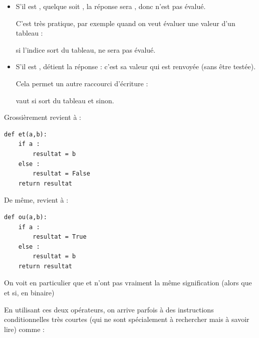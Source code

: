 \begin{itemize}
	\item S'il est , quelque soit , la réponse sera , donc  n'est pas évalué.
	
	C'est très pratique, par exemple quand on veut évaluer une valeur d'un tableau :
	
	 si l'indice sort du tableau,  ne sera pas évalué.
	
	\item S'il est ,  détient la réponse : c'est sa valeur qui est renvoyée (sans être testée).
	
	Cela permet un autre raccourci d'écriture : 
	
	 vaut  si  sort du tableau et  sinon.
\end{itemize}

\begin{multicols}{2}

Grossièrement  revient à :

\begin{verbatim}
def et(a,b):
    if a :
        resultat = b
    else :
        resultat = False
    return resultat
\end{verbatim}

De même,   revient à :

\begin{verbatim}
def ou(a,b):
    if a :
        resultat = True
    else :
        resultat = b
    return resultat
\end{verbatim}

\end{multicols}

On voit en particulier que  et  n'ont pas vraiment la même signification (alors que  et  si, en binaire)

En utilisant ces deux opérateurs, on arrive parfois à des instructions conditionnelles très courtes (qui ne sont spécialement à rechercher mais à savoir lire) comme :  

